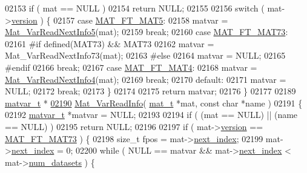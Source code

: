 \begin{DoxyCode}
{{{{{{{{{{{{{{{{{{{{{{{{{{{{{{{{{{{{{{{{{{{02153     \textcolor{keywordflow}{if} ( mat == NULL )
02154         \textcolor{keywordflow}{return} NULL;
02155 
02156     \textcolor{keywordflow}{switch} ( mat->\hyperlink{struct__mat__t_a729c2bc0afc97485057a5af425635b1a}{version} ) \{
02157         \textcolor{keywordflow}{case} \hyperlink{group___m_a_t_ggad03442b8378999189d510e3745c702b7a31ade1f6989411dc0299007e2c7d33b2}{MAT\_FT\_MAT5}:
02158             matvar = \hyperlink{mat5_8c_a5defc934cf088b13347e50ea7f276ea3}{Mat\_VarReadNextInfo5}(mat);
02159             \textcolor{keywordflow}{break};
02160         \textcolor{keywordflow}{case} \hyperlink{group___m_a_t_ggad03442b8378999189d510e3745c702b7a765c5d1d5038947646260dc82483517e}{MAT\_FT\_MAT73}:
02161 \textcolor{preprocessor}{#if defined(MAT73) && MAT73}
02162             matvar = Mat\_VarReadNextInfo73(mat);
02163 \textcolor{preprocessor}{#else}
02164             matvar = NULL;
02165 \textcolor{preprocessor}{#endif}
02166             \textcolor{keywordflow}{break};
02167         \textcolor{keywordflow}{case} \hyperlink{group___m_a_t_ggad03442b8378999189d510e3745c702b7a858b4f5da65548219b1c3ad47aa478d3}{MAT\_FT\_MAT4}:
02168             matvar = \hyperlink{mat4_8c_a494a64be8f002874f2048687561f65d3}{Mat\_VarReadNextInfo4}(mat);
02169             \textcolor{keywordflow}{break};
02170         \textcolor{keywordflow}{default}:
02171             matvar = NULL;
02172             \textcolor{keywordflow}{break};
02173     \}
02174 
02175     \textcolor{keywordflow}{return} matvar;
02176 \}
02177 
02189 \hyperlink{group___m_a_t_structmatvar__t}{matvar\_t} *
\hyperlink{group___m_a_t_ga46da2e45ed96d3f1a6ec643757f2b086}{02190} \hyperlink{group___m_a_t_ga46da2e45ed96d3f1a6ec643757f2b086}{Mat\_VarReadInfo}( \hyperlink{struct__mat__t}{mat\_t} *mat, \textcolor{keyword}{const} \textcolor{keywordtype}{char} *name )
02191 \{
02192     \hyperlink{group___m_a_t_structmatvar__t}{matvar\_t} *matvar = NULL;
02193 
02194     \textcolor{keywordflow}{if} ( (mat == NULL) || (name == NULL) )
02195         \textcolor{keywordflow}{return} NULL;
02196 
02197     \textcolor{keywordflow}{if} ( mat->\hyperlink{struct__mat__t_a729c2bc0afc97485057a5af425635b1a}{version} == \hyperlink{group___m_a_t_ggad03442b8378999189d510e3745c702b7a765c5d1d5038947646260dc82483517e}{MAT\_FT\_MAT73} ) \{
02198         \textcolor{keywordtype}{size\_t} fpos = mat->\hyperlink{struct__mat__t_a0163a12f9735356723bb604992639d9e}{next\_index};
02199         mat->\hyperlink{struct__mat__t_a0163a12f9735356723bb604992639d9e}{next\_index} = 0;
02200         \textcolor{keywordflow}{while} ( NULL == matvar && mat->\hyperlink{struct__mat__t_a0163a12f9735356723bb604992639d9e}{next\_index} < mat->\hyperlink{struct__mat__t_af37d0ba323e65edb27ecd5a2f766a3a4}{num\_datasets} ) \{
}}}}}}}}}}}}}}}}}}}}}}}}}}}}}}}}}}}}}}}}}}}
\end{DoxyCode}

